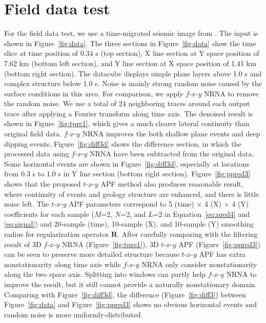 \section{Field data test}
For the field data test, we use a time-migrated seismic image from
\cite{Liu13}. The input is shown in Figure~\ref{fig:data}. 
The three sections in Figure~\ref{fig:data} show the time slice at
time position of 0.34 s (top section), X line section at Y space
position of 7.62 km (bottom left section), and Y line section at X
space position of 1.41 km (bottom right section). The datacube
displays simple plane layers above 1.0 s and complex structure below
1.0 s.  Noise is mainly strong random noise caused by the surface
conditions in this area. For comparison, we apply $f$-$x$-$y$ NRNA to
remove the random noise. We use a total of 24 neighboring traces
around each output trace after applying a Fourier transform along time
axis. The denoised result is shown in Figure~\ref{fig:tpre1}, which
gives a much clearer lateral continuity than original field
data. $f$-$x$-$y$ NRNA improves the both shallow plane events and deep
dipping events. Figure~\ref{fig:diff3d} shows the difference section,
in which the processed data using $f$-$x$-$y$ NRNA have been
subtracted from the original data. Some horizontal events are shown in
Figure~\ref{fig:diff3d}, especially at locations from 0.3 s to 1.0 s
in Y line section (bottom right section). Figure~\ref{fig:ppred3}
shows that the proposed $t$-$x$-$y$ APF method also produces
reasonable result, where continuity of events and geology structure
are enhanced, and there is little noise left. The $t$-$x$-$y$ APF
parameters correspond to 5 (time) $\times$ 4 (X) $\times$ 4 (Y)
coefficients for each sample ($M$=2, $N$=2, and $L$=2 in
Equation~\ref{eq:pred4} and
\ref{eq:signal}) and 20-sample (time), 10-sample (X), and 10-sample
(Y) smoothing radius for regularization operator $\mathbf{R}$. After
carefully comparing with the filtering result of 3D $f$-$x$-$y$ NRNA
(Figure~\ref{fig:tpre1}), 3D $t$-$x$-$y$ APF (Figure~\ref{fig:ppred3})
can be seen to preserve more detailed structure because $t$-$x$-$y$
APF has extra nonstationarity along time axis while $f$-$x$-$y$ NRNA
only consider nonstationarity along the two space axis. Splitting into
windows can partly help $f$-$x$-$y$ NRNA to improve the result, but it
still cannot provide a naturally nonstationary domain. Comparing with
Figure~\ref{fig:diff3d}, the difference (Figure~\ref{fig:diff3})
between Figure~\ref{fig:data} and Figure~\ref{fig:ppred3} shows no
obvious horizontal events and random noise is more
uniformly-distributed.

